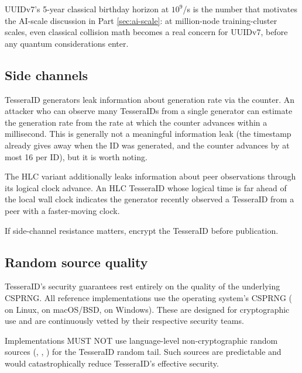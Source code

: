 UUIDv7's 5-year classical birthday horizon at $10^9$/s is the number that motivates the AI-scale discussion in Part \ref{sec:ai-scale}: at million-node training-cluster scales, even classical collision math becomes a real concern for UUIDv7, before any quantum considerations enter.

\subsection{Side channels}

TesseraID generators leak information about generation rate via the counter. An attacker who can observe many TesseraIDs from a single generator can estimate the generation rate from the rate at which the counter advances within a millisecond. This is generally not a meaningful information leak (the timestamp already gives away when the ID was generated, and the counter advances by at most 16 per ID), but it is worth noting.

The HLC variant additionally leaks information about peer observations through its logical clock advance. An HLC TesseraID whose logical time is far ahead of the local wall clock indicates the generator recently observed a TesseraID from a peer with a faster-moving clock.

If side-channel resistance matters, encrypt the TesseraID before publication.

\subsection{Random source quality}

TesseraID's security guarantees rest entirely on the quality of the underlying CSPRNG. All reference implementations use the operating system's CSPRNG ( on Linux,  on macOS/BSD,  on Windows). These are designed for cryptographic use and are continuously vetted by their respective security teams.

Implementations MUST NOT use language-level non-cryptographic random sources (, , ) for the TesseraID random tail. Such sources are predictable and would catastrophically reduce TesseraID's effective security.

